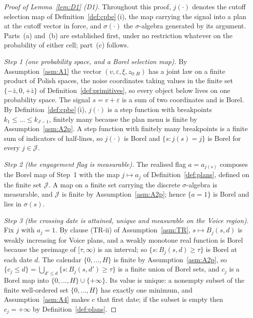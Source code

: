 \begin{proof}[Proof of Lemma~\ref{lem:D1} (D1)]
Throughout this proof, $j(\cdot)$ denotes the cutoff selection map of
Definition~\ref{def:cpbe}\,(i), the map carrying the signal into a plan at the cutoff vector in
force, and $\sigma(\cdot)$ the $\sigma$-algebra generated by its argument. Parts~(a) and~(b) are established first, under no restriction whatever on
the probability of either cell; part~(c) follows.

\emph{Step 1 (one probability space, and a Borel selection map).} By Assumption~\ref{asm:A1} the
vector $(v,\varepsilon,\xi,z_{0:H})$ has a joint law on a finite product of Polish spaces, the noise
coordinates taking values in the finite set $\{-\bar z,0,+\bar z\}$ of
Definition~\ref{def:primitives}, so every object below lives on one probability space. The signal
$s = v+\varepsilon$ is a sum of two coordinates and is Borel. By Definition~\ref{def:cpbe}\,(i),
$j(\cdot)$ is a step function with breakpoints $k_1 \le \dots \le k_{J-1}$, finitely many because the
plan menu is finite by Assumption~\ref{asm:A2p}. A step function with finitely many breakpoints is a
finite sum of indicators of half-lines, so $j(\cdot)$ is Borel and $\{s : j(s) = j\}$ is Borel for
every $j \in \mathcal J$.

\emph{Step 2 (the engagement flag is measurable).} The realised flag $a = a_{j(s)}$ composes the
Borel map of Step~1 with the map $j \mapsto a_j$ of Definition~\ref{def:plans}, defined on the finite
set $\mathcal J$. A map on a finite set carrying the discrete $\sigma$-algebra is measurable, and
$\mathcal J$ is finite by Assumption~\ref{asm:A2p}; hence $\{a=1\}$ is Borel and lies in $\sigma(s)$.

\emph{Step 3 (the crossing date is attained, unique and measurable on the Voice region).} Fix $j$
with $a_j = 1$. By clause (TR-ii) of Assumption~\ref{asm:TR}, $s \mapsto B_j(s,d)$ is weakly
increasing for Voice plans, and a weakly monotone real function is Borel because the preimage of
$[\tau,\infty)$ is an interval; so $\{s : B_j(s,d) \ge \tau\}$ is Borel at each date $d$. The
calendar $\{0,\dots,H\}$ is finite by Assumption~\ref{asm:A2p}, so
$\{c_j \le d\} = \bigcup_{d' \le d}\{s : B_j(s,d') \ge \tau\}$ is a finite union of Borel sets, and
$c_j$ is a Borel map into $\{0,\dots,H\} \cup \{+\infty\}$. Its value is unique: a nonempty subset of
the finite well-ordered set $\{0,\dots,H\}$ has exactly one minimum, and Assumption~\ref{asm:A4}
makes $c$ that first date; if the subset is empty then $c_j = +\infty$ by Definition~\ref{def:plans}.


\end{proof}
